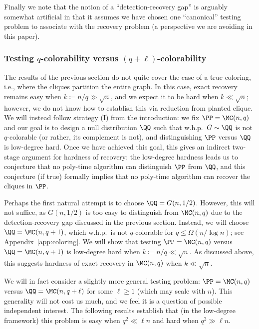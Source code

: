 \documentclass{article}
\begin{document}
Finally we note that the notion of a ``detection-recovery gap'' is arguably somewhat artificial in that it assumes we have chosen one ``canonical'' testing problem to associate with the recovery problem (a perspective we are avoiding in this paper).




\subsubsection{Testing $q$-colorability versus $(q+\ell)$-colorability}
\label{sec:q-vs-ql}

The results of the previous section do not quite cover the case of a true coloring, i.e., where the cliques partition the entire graph. In this case, exact recovery remains easy when $k \coloneqq n/q \gg \sqrt{n}$, and we expect it to be hard when $k \ll \sqrt{n}$; however, we do not know how to establish this via reduction from planted clique. We will instead follow strategy (I) from the introduction: we fix $\PP = \MC(n,q)$ and our goal is to design a null distribution $\QQ$ such that w.h.p.\ $G \sim \QQ$ is not $q$-colorable (or rather, its complement is not), and distinguishing $\PP$ versus $\QQ$ is low-degree hard. Once we have achieved this goal, this gives an indirect two-stage argument for hardness of recovery: the low-degree hardness leads us to conjecture that no poly-time algorithm can distinguish $\PP$ from $\QQ$, and this conjecture (if true) formally implies that no poly-time algorithm can recover the cliques in $\PP$.

Perhaps the first natural attempt is to choose $\QQ = G(n,1/2)$. However, this will not suffice, as $G(n,1/2)$ is too easy to distinguish from $\MC(n,q)$ due to the detection-recovery gap discussed in the previous section. Instead, we will choose $\QQ = \MC(n,q+1)$, which w.h.p.\ is not $q$-colorable for $q \leq \Omega(n/\log n)$; see Appendix~\ref{app:coloring}.
We will show that testing $\PP = \MC(n,q)$ versus $\QQ = \MC(n,q+1)$ is low-degree hard when $k \coloneqq n/q \ll \sqrt{n}$. As discussed above, this suggests hardness of exact recovery in $\MC(n,q)$ when $k \ll \sqrt{n}$.

We will in fact consider a slightly more general testing problem: $\PP = \MC(n,q)$ versus $\QQ = \MC(n,q+\ell)$ for some $\ell \ge 1$ (which may scale with $n$). This generality will not cost us much, and we feel it is a question of possible independent interest. The following results establish that (in the low-degree framework) this problem is easy when $q^2 \ll \ell n$ and hard when $q^2 \gg \ell n$.
\end{document}
